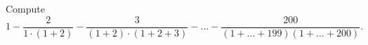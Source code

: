 Compute \[1-\dfrac{2}{1\cdot(1+2)}-\dfrac{3}{(1+2)\cdot(1+2+3)}-\ldots-\dfrac{200}{(1+\ldots+199)(1+\ldots+200)}.\]
